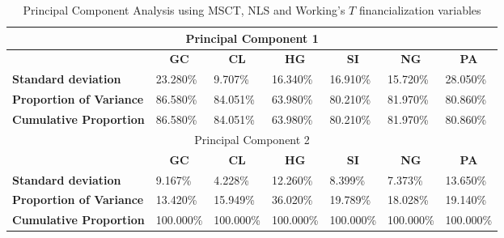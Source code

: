 \begin{table}[]
\caption{Principal Component Analysis using MSCT, NLS and Working's $T$ financialization variables}
\label{tab:PCA}
\begin{tabular}{@{}lllllll@{}}
\toprule
\multicolumn{7}{c}{Principal Component 1}                                                                                                                                                                                                   \\ \midrule
                                & \multicolumn{1}{c}{\textbf{GC}} & \multicolumn{1}{c}{\textbf{CL}} & \multicolumn{1}{c}{\textbf{HG}} & \multicolumn{1}{c}{\textbf{SI}} & \multicolumn{1}{c}{\textbf{NG}} & \multicolumn{1}{c}{\textbf{PA}} \\ \midrule
\textbf{Standard deviation}     & 23.280\%                        & 9.707\%                         & 16.340\%                        & 16.910\%                        & 15.720\%                        & 28.050\%                        \\
\textbf{Proportion of Variance} & 86.580\%                        & 84.051\%                        & 63.980\%                        & 80.210\%                        & 81.970\%                        & 80.860\%                        \\
\textbf{Cumulative Proportion}  & 86.580\%                        & 84.051\%                        & 63.980\%                        & 80.210\%                        & 81.970\%                        & 80.860\%                        \\ \midrule
\multicolumn{7}{c}{Principal Component 2}                                                                                                                                                                                                   \\ \midrule
\textbf{}                       & \multicolumn{1}{c}{\textbf{GC}} & \multicolumn{1}{c}{\textbf{CL}} & \multicolumn{1}{c}{\textbf{HG}} & \multicolumn{1}{c}{\textbf{SI}} & \multicolumn{1}{c}{\textbf{NG}} & \multicolumn{1}{c}{\textbf{PA}} \\ \midrule
\textbf{Standard deviation}     & 9.167\%                         & 4.228\%                         & 12.260\%                        & 8.399\%                         & 7.373\%                         & 13.650\%                        \\
\textbf{Proportion of Variance} & 13.420\%                        & 15.949\%                        & 36.020\%                        & 19.789\%                        & 18.028\%                        & 19.140\%                        \\
\textbf{Cumulative Proportion}  & 100.000\%                       & 100.000\%                       & 100.000\%                       & 100.000\%                       & 100.000\%                       & 100.000\%                       \\ \bottomrule
\end{tabular}
\end{table}




